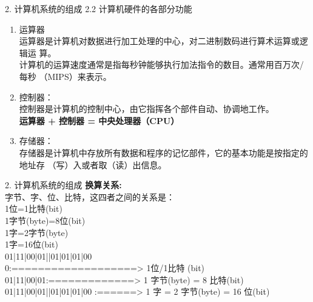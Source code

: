 \documentclass[aspectratio=169]{beamer}
\begin{document}
\begin{frame}[t]{2. 计算机系统的组成} \vspace{20pt}
    2.2 计算机硬件的各部分功能
    \begin{enumerate}
        \item {运算器}\\
            运算器是计算机对数据进行加工处理的中心，对二进制数码进行算术运算或逻辑运
算。\\
计算机的运算速度通常是指每秒钟能够执行加法指令的数目。通常用百万次/每秒
（MIPS）来表示。\\

\item {控制器：}\\
    控制器是计算机的控制中心，由它指挥各个部件自动、协调地工作。\\

    \textbf{运算器 + 控制器 = 中央处理器（CPU）}

\item {存储器：}\\
    存储器是计算机中存放所有数据和程序的记忆部件，它的基本功能是按指定的地址存
（写）入或者取（读）出信息。\\


    \end{enumerate}
\end{frame}


\begin{frame}[t]{2. 计算机系统的组成} \vspace{20pt}
\textbf{换算关系:}\\
字节、字、位、比特，这四者之间的关系是：\\

    1位=1比特(bit)\\
    1字节(byte)=8位(bit)\\
    1字=2字节(byte)\\
    1字=16位(bit)\\ 

    01|11|00|01||01|01|01|00\\
    0:===================> 1位/1比特 (bit)\\
    01|11|00|01:=============> 1 字节(byte) = 8 比特(bit)\\
    01|11|00|01||01|01|01|00 :======> 1 字 = 2 字节(byte) = 16 位(bit)\\
\end{frame}
\end{document}
